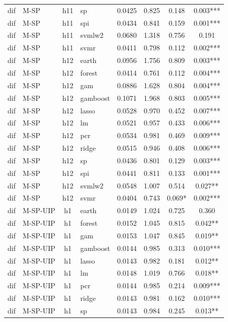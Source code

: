 \begin{ThreePartTable}
\begin{longtable}[t]{llclcccc}
dif & M-SP & h11 & sp & 0.0425 & 0.825 & 0.148 & 0.003***\\
dif & M-SP & h11 & spi & 0.0434 & 0.841 & 0.159 & 0.001***\\
dif & M-SP & h11 & svmlw2 & 0.0680 & 1.318 & 0.756 & 0.191\\
dif & M-SP & h11 & svmr & 0.0411 & 0.798 & 0.112 & 0.002***\\
\addlinespace
dif & M-SP & h12 & earth & 0.0956 & 1.756 & 0.809 & 0.003***\\
dif & M-SP & h12 & forest & 0.0414 & 0.761 & 0.112 & 0.004***\\
dif & M-SP & h12 & gam & 0.0886 & 1.628 & 0.804 & 0.004***\\
dif & M-SP & h12 & gamboost & 0.1071 & 1.968 & 0.803 & 0.005***\\
dif & M-SP & h12 & lasso & 0.0528 & 0.970 & 0.452 & 0.007***\\
dif & M-SP & h12 & lm & 0.0521 & 0.957 & 0.433 & 0.006***\\
dif & M-SP & h12 & pcr & 0.0534 & 0.981 & 0.469 & 0.009***\\
dif & M-SP & h12 & ridge & 0.0515 & 0.946 & 0.408 & 0.006***\\
dif & M-SP & h12 & sp & 0.0436 & 0.801 & 0.129 & 0.003***\\
dif & M-SP & h12 & spi & 0.0441 & 0.811 & 0.133 & 0.001***\\
dif & M-SP & h12 & svmlw2 & 0.0548 & 1.007 & 0.514 & 0.027**\\
dif & M-SP & h12 & svmr & 0.0404 & 0.743 & 0.069* & 0.002***\\
\addlinespace
dif & M-SP-UIP & h1 & earth & 0.0149 & 1.024 & 0.725 & 0.360\\
dif & M-SP-UIP & h1 & forest & 0.0152 & 1.045 & 0.815 & 0.042**\\
dif & M-SP-UIP & h1 & gam & 0.0153 & 1.047 & 0.845 & 0.019**\\
dif & M-SP-UIP & h1 & gamboost & 0.0144 & 0.985 & 0.313 & 0.010***\\
dif & M-SP-UIP & h1 & lasso & 0.0143 & 0.982 & 0.181 & 0.012**\\
dif & M-SP-UIP & h1 & lm & 0.0148 & 1.019 & 0.766 & 0.018**\\
dif & M-SP-UIP & h1 & pcr & 0.0144 & 0.985 & 0.214 & 0.009***\\
dif & M-SP-UIP & h1 & ridge & 0.0143 & 0.981 & 0.162 & 0.010***\\
dif & M-SP-UIP & h1 & sp & 0.0143 & 0.984 & 0.245 & 0.013**\\

\end{longtable}
\end{ThreePartTable}
